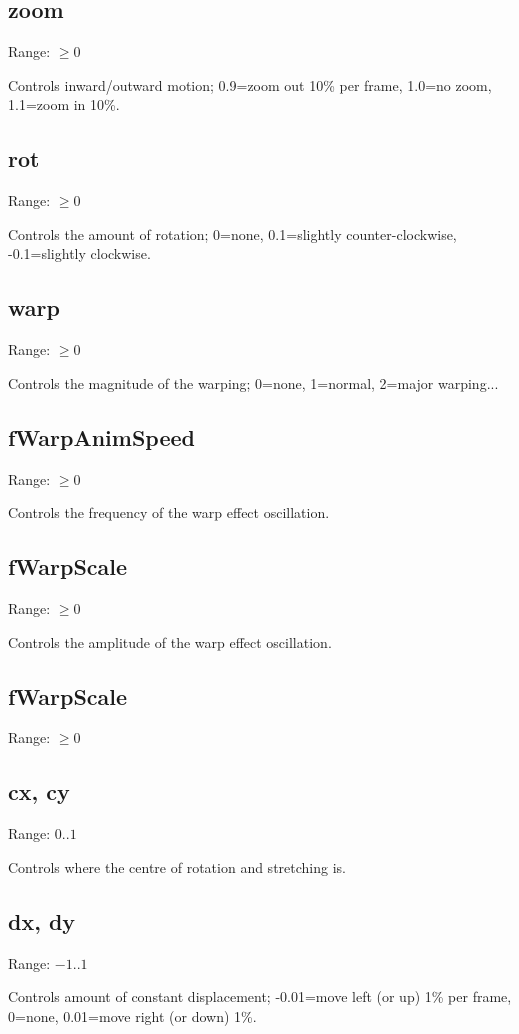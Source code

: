 \documentclass[11pt, a5paper, pagesize]{scrbook}
\begin{document}
\subsection{zoom}
Range: $\geq 0$

Controls inward/outward motion; 0.9=zoom out 10\% per frame, 1.0=no zoom, 1.1=zoom in 10\%.

\subsection{rot}
Range: $\geq 0$

Controls the amount of rotation; 0=none, 0.1=slightly counter-clockwise, -0.1=slightly clockwise.

\subsection{warp}
Range: $\geq 0$

Controls the magnitude of the warping; 0=none, 1=normal, 2=major warping...

\subsection{fWarpAnimSpeed}
Range: $\geq 0$

Controls the frequency of the warp effect oscillation.

\subsection{fWarpScale}
Range: $\geq 0$

Controls the amplitude of the warp effect oscillation.

\subsection{fWarpScale}
Range: $\geq 0$

\subsection{cx, cy}
Range: $0..1$

Controls where the centre of rotation and stretching is.

\subsection{dx, dy}
Range: $-1..1$

Controls amount of constant displacement; -0.01=move left (or up) 1\% per frame, 0=none, 0.01=move right (or down) 1\%.
\end{document}

